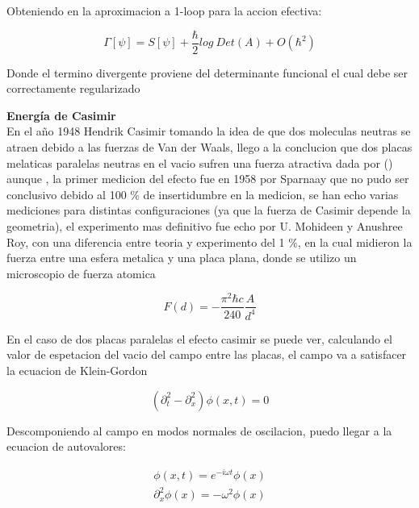 Obteniendo en la aproximacion a 1-loop para la accion efectiva:

\begin{equation}
\Gamma [\psi] = S [\psi] + \frac{\hbar}{2} log \ Det (A) +
O ( \hbar ^2 )
\end{equation}

Donde el termino divergente proviene del determinante funcional el cual debe ser correctamente regularizado


\textbf{Energía de Casimir} \\

En el año 1948 Hendrik Casimir tomando la idea de que dos moleculas neutras se atraen debido a las fuerzas de Van der Waals, llego a la conclucion que dos placas melaticas paralelas neutras en el vacio sufren una fuerza atractiva dada por (\label{casimir.1}) aunque , la primer medicion del efecto fue en 1958 por Sparnaay que no pudo ser conclusivo debido al 100 \% de insertidumbre en la medicion, se han echo varias mediciones para distintas configuraciones (ya que la fuerza de Casimir depende la geometria), el experimento mas definitivo fue echo por U. Mohideen y Anushree Roy, con una diferencia entre teoria y experimento del 1 \%, en la cual midieron la fuerza entre una esfera metalica y una placa plana, donde se utilizo un microscopio de fuerza atomica 


\begin{equation}
F(d) = - \frac{\pi ^2 \hbar c}{240} \frac{A}{d^4}
\label{casimir.1}
\end{equation}




En el caso de dos placas paralelas el efecto casimir se puede ver, calculando el valor de espetacion del vacio del campo entre las placas, el campo va a satisfacer la ecuacion de Klein-Gordon

\begin{equation}
( \partial _t ^2 - \partial _x ^2  ) \phi (x,t) = 0 
\end{equation}

Descomponiendo al campo en modos normales de oscilacion, puedo llegar a la ecuacion de autovalores:

\begin{equation}
\begin{array}{c}
\phi (x,t) = e ^{-i \omega t} \phi (x) \\
\partial _x ^2 \phi (x) = - \omega ^2 \phi (x)
\end{array}
\end{equation}

